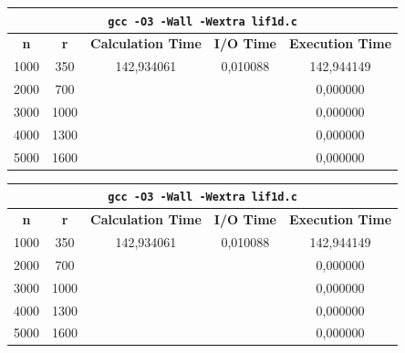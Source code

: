 \documentclass[a4paper,oneside,titlepage,10pt]{article}
\begin{document}
\begin{table}[!h]
	\centering
	\begin{tabular}{|c|c|c|c|c|}
		\hline
		\multicolumn{5}{|c|}{\cellcolor[HTML]{EFEFEF}\texttt{\textbf{gcc -O3 -Wall -Wextra lif1d.c}}}                       \\ \hline
		\textbf{n} & \textbf{r} & \textbf{Calculation Time} & \textbf{I/O Time} & \textbf{Execution Time} \\ \hline
		1000       & 350        & 142,934061                & 0,010088          & 142,944149              \\ \hline
		2000       & 700        &                           &                   & 0,000000                \\ \hline
		3000       & 1000       &                           &                   & 0,000000                \\ \hline
		4000       & 1300       &                           &                   & 0,000000                \\ \hline
		5000       & 1600       &                           &                   & 0,000000                \\ \hline
	\end{tabular}
\end{table}

\begin{table}[!h]
	\centering
	\begin{tabular}{|c|c|c|c|c|}
		\hline
		\multicolumn{5}{|c|}{\texttt{\textbf{gcc -O3 -Wall -Wextra lif1d.c}}}                                              \\ \hline
		\textbf{n} & \textbf{r} & \textbf{Calculation Time} & \textbf{I/O Time} & \textbf{Execution Time} \\ \hline
		1000       & 350        & 142,934061                & 0,010088          & 142,944149              \\ \hline
		2000       & 700        &                           &                   & 0,000000                \\ \hline
		3000       & 1000       &                           &                   & 0,000000                \\ \hline
		4000       & 1300       &                           &                   & 0,000000                \\ \hline
		5000       & 1600       &                           &                   & 0,000000                \\ \hline
	\end{tabular}
\end{table}
\end{document}
